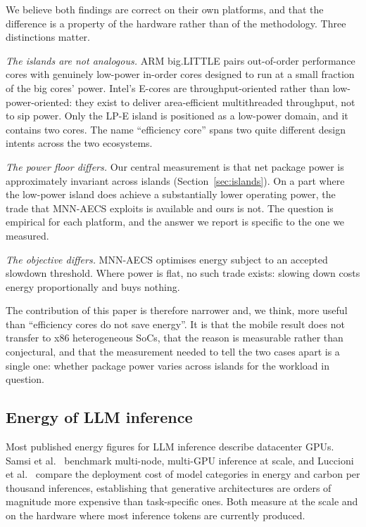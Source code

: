 \documentclass[journal]{IEEEtran}
\begin{document}
We believe both findings are correct on their own platforms, and that the
difference is a property of the hardware rather than of the methodology. Three
distinctions matter.

\emph{The islands are not analogous.} ARM big.LITTLE pairs out-of-order
performance cores with genuinely low-power in-order cores designed to run at a
small fraction of the big cores' power. Intel's E-cores are throughput-oriented
rather than low-power-oriented: they exist to deliver area-efficient
multithreaded throughput, not to sip power. Only the LP-E island is positioned
as a low-power domain, and it contains two cores. The name ``efficiency core''
spans two quite different design intents across the two ecosystems.

\emph{The power floor differs.} Our central measurement is that net package
power is approximately invariant across islands (Section~\ref{sec:islands}). On
a part where the low-power island does achieve a substantially lower operating
power, the trade that MNN-AECS exploits is available and ours is not. The
question is empirical for each platform, and the answer we report is specific
to the one we measured.

\emph{The objective differs.} MNN-AECS optimises energy subject to an accepted
slowdown threshold. Where power is flat, no such trade exists: slowing down
costs energy proportionally and buys nothing.

The contribution of this paper is therefore narrower and, we think, more useful
than ``efficiency cores do not save energy''. It is that the mobile result does
not transfer to x86 heterogeneous SoCs, that the reason is measurable rather
than conjectural, and that the measurement needed to tell the two cases apart
is a single one: whether package power varies across islands for the workload
in question.

\subsection{Energy of LLM inference}
Most published energy figures for LLM inference describe datacenter GPUs.
Samsi et al.~\cite{samsi2023words} benchmark multi-node, multi-GPU inference at
scale, and Luccioni et al.~\cite{luccioni2024power} compare the deployment cost
of model categories in energy and carbon per thousand inferences, establishing
that generative architectures are orders of magnitude more expensive than
task-specific ones. Both measure at the scale and on the hardware where most
inference tokens are currently produced.
\end{document}
